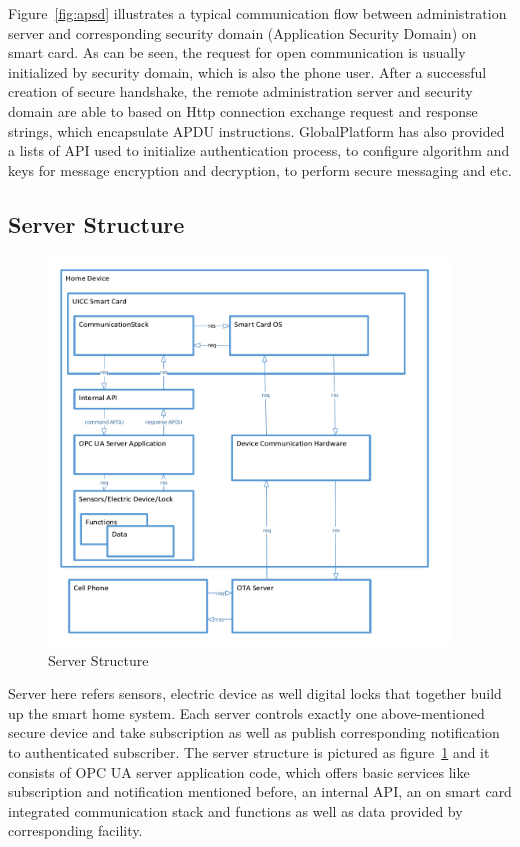 Figure~\ref{fig:apsd} illustrates a typical communication flow between administration server and corresponding security domain (Application Security Domain) on smart card. As can be seen, the request for open communication is usually initialized by security domain, which is also the phone user. After a successful creation of secure handshake, the remote administration server and security domain are able to based on Http connection exchange request and response strings, which encapsulate APDU instructions. GlobalPlatform has also provided  a lists of API used to initialize authentication process, to configure algorithm and keys for message encryption and decryption, to perform secure messaging and etc.

\subsection{Server Structure}

\begin{figure}
	\centering
	\includegraphics[width=0.95\textwidth]{serverStructure}
		\caption{Server Structure}
	\label{fig:serverStructure}
\end{figure}
Server here refers sensors, electric device as well digital locks that together build up the smart home system. Each server controls exactly one above-mentioned secure device and take subscription as well as publish corresponding notification to authenticated subscriber. The server structure is pictured as figure~\ref{fig:serverStructure} and it consists of OPC UA server application code, which offers basic services like subscription and notification mentioned before, an internal API, an on smart card integrated communication stack and functions as well as data provided by corresponding facility.

